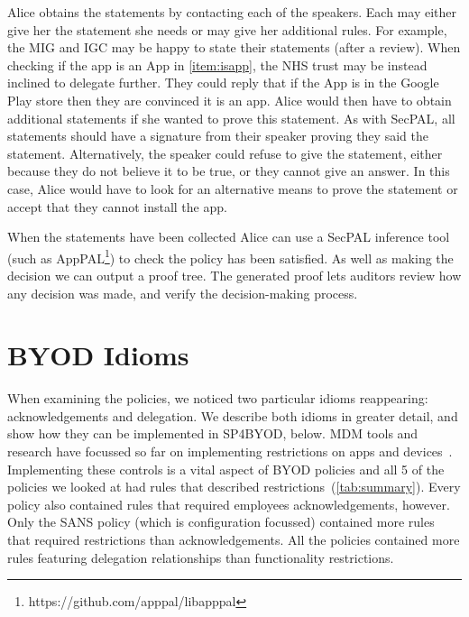 \documentclass{llncs}
\newcommand{\AppPAL}[0]{SP4BYOD}
\begin{document}
Alice obtains the statements by contacting each of the speakers. 
Each may either give her the statement she needs or may give her additional rules.
For example, the MIG and IGC may be happy to state their statements (after a review).
When checking if the app is an App in \autoref{item:isapp}, the NHS trust may be instead inclined to delegate further.
They could reply that if the App is in the Google Play store then they are convinced it is an app.
Alice would then have to obtain additional statements if she wanted to prove this statement.
As with SecPAL, all statements should have a signature from their speaker proving they said the statement.
Alternatively, the speaker could refuse to give the statement, either because they do not believe it to be true, or they cannot give an answer.
In this case, Alice would have to look for an alternative means to prove the statement or accept that they cannot install the app.

When the statements have been collected 
  Alice can use a SecPAL inference tool (such as AppPAL\footnote{https://github.com/apppal/libapppal}) to check the policy has been satisfied.
As well as making the decision we can output a proof tree.%
The generated proof lets auditors review how any decision was made, and verify the decision-making process.


\section{BYOD Idioms}
\label{sec:idioms}

When examining the policies, we noticed two particular idioms reappearing: acknowledgements and delegation.
We describe both idioms in greater detail, and show how they can be implemented in \AppPAL{}, below.
MDM tools and research have focussed so far on implementing restrictions on apps and devices~\cite{_ibm_????,armando_formal_2014,martinelli_enhancing_2016}.
Implementing these controls is a vital aspect of BYOD policies and all 5 of the policies we looked at had rules that described restrictions~(\autoref{tab:summary}).
Every policy also contained rules that required employees acknowledgements, however.
Only the SANS policy (which is configuration focussed) contained more rules that required restrictions than acknowledgements. 
All the policies contained more rules featuring delegation relationships than functionality restrictions.
\end{document}
